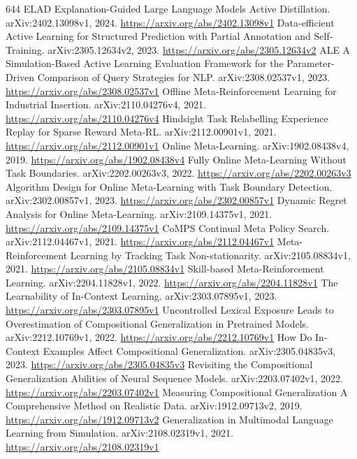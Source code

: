 \documentclass[11pt]{article}
\begin{document}
\begin{thebibliography}{644}
 ELAD Explanation-Guided Large Language Models Active Distillation. arXiv:2402.13098v1, 2024. \url{https://arxiv.org/abs/2402.13098v1}
 Data-efficient Active Learning for Structured Prediction with Partial Annotation and Self-Training. arXiv:2305.12634v2, 2023. \url{https://arxiv.org/abs/2305.12634v2}
 ALE A Simulation-Based Active Learning Evaluation Framework for the Parameter-Driven Comparison of Query Strategies for NLP. arXiv:2308.02537v1, 2023. \url{https://arxiv.org/abs/2308.02537v1}
 Offline Meta-Reinforcement Learning for Industrial Insertion. arXiv:2110.04276v4, 2021. \url{https://arxiv.org/abs/2110.04276v4}
 Hindsight Task Relabelling Experience Replay for Sparse Reward Meta-RL. arXiv:2112.00901v1, 2021. \url{https://arxiv.org/abs/2112.00901v1}
 Online Meta-Learning. arXiv:1902.08438v4, 2019. \url{https://arxiv.org/abs/1902.08438v4}
 Fully Online Meta-Learning Without Task Boundaries. arXiv:2202.00263v3, 2022. \url{https://arxiv.org/abs/2202.00263v3}
 Algorithm Design for Online Meta-Learning with Task Boundary Detection. arXiv:2302.00857v1, 2023. \url{https://arxiv.org/abs/2302.00857v1}
 Dynamic Regret Analysis for Online Meta-Learning. arXiv:2109.14375v1, 2021. \url{https://arxiv.org/abs/2109.14375v1}
 CoMPS Continual Meta Policy Search. arXiv:2112.04467v1, 2021. \url{https://arxiv.org/abs/2112.04467v1}
 Meta-Reinforcement Learning by Tracking Task Non-stationarity. arXiv:2105.08834v1, 2021. \url{https://arxiv.org/abs/2105.08834v1}
 Skill-based Meta-Reinforcement Learning. arXiv:2204.11828v1, 2022. \url{https://arxiv.org/abs/2204.11828v1}
 The Learnability of In-Context Learning. arXiv:2303.07895v1, 2023. \url{https://arxiv.org/abs/2303.07895v1}
 Uncontrolled Lexical Exposure Leads to Overestimation of Compositional Generalization in Pretrained Models. arXiv:2212.10769v1, 2022. \url{https://arxiv.org/abs/2212.10769v1}
 How Do In-Context Examples Affect Compositional Generalization. arXiv:2305.04835v3, 2023. \url{https://arxiv.org/abs/2305.04835v3}
 Revisiting the Compositional Generalization Abilities of Neural Sequence Models. arXiv:2203.07402v1, 2022. \url{https://arxiv.org/abs/2203.07402v1}
 Measuring Compositional Generalization A Comprehensive Method on Realistic Data. arXiv:1912.09713v2, 2019. \url{https://arxiv.org/abs/1912.09713v2}
 Generalization in Multimodal Language Learning from Simulation. arXiv:2108.02319v1, 2021. \url{https://arxiv.org/abs/2108.02319v1}

\end{thebibliography}
\end{document}
